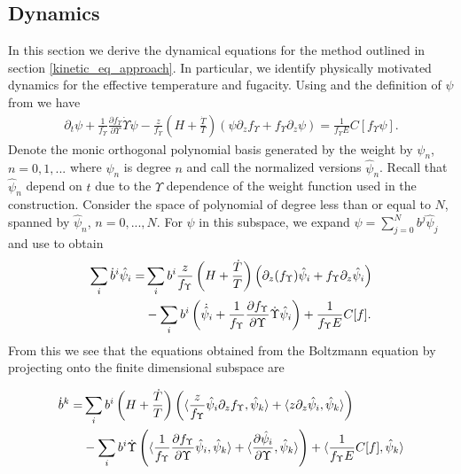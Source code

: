 \subsection{Dynamics}\label{dynamics_sec}
In this section we derive the dynamical equations for the  method outlined in section \ref{kinetic_eq_approach}.  In particular, we identify physically motivated dynamics for the effective temperature and fugacity.  Using  and the definition of $\psi$ from  we have
\begin{align}\label{near_equilib_eq}
\partial_t \psi+\frac{1}{f_\Upsilon }\frac{\partial f_\Upsilon }{\partial\Upsilon}\dot\Upsilon\psi-\frac{z}{f_\Upsilon }\left(H+\frac{\dot{T}}{T}\right)\left(\psi\partial_zf_\Upsilon +f_\Upsilon \partial_z \psi\right)=\frac{1}{f_\Upsilon E}C[f_\Upsilon \psi].
\end{align}
 Denote the monic orthogonal polynomial basis generated by the weight  by $\psi_n$, $n=0,1,...$ where $\psi_n$ is degree $n$ and call the normalized versions  $\hat{\psi}_n$. Recall that $\hat\psi_n$ depend on $t$ due to the $\Upsilon$ dependence of the weight function used in the construction. Consider the space of polynomial of degree less than or equal to $N$, spanned by $\hat\psi_n$, $n=0,...,N$.   For $\psi$ in this subspace, we expand $\psi=\sum_{j=0}^Nb^j\hat\psi_j$ and use   to obtain
\begin{align}\label{T_vars}
\sum_i \dot{b}^i\hat\psi_i=&\sum_ib^i\frac{z}{f_\Upsilon }\left(H+\frac{\dot{T}}{T}\right)\left(\partial_z(f_\Upsilon )\hat\psi_i+f_\Upsilon \partial_z\hat\psi_i\right)\\
&-\sum_ib^i\left(\dot{\hat{\psi}}_i+\frac{1}{f_\Upsilon }\frac{\partial f_\Upsilon }{\partial\Upsilon}\dot\Upsilon\hat\psi_i\right)+\frac{1}{f_\Upsilon E}C[f].
\notag
\end{align}
From this we see  that the equations obtained from the Boltzmann equation by projecting onto the finite dimensional subspace are

\begin{align}
\dot b^k=& \sum_i b^i\left(H+\frac{\dot{T}}{T}\right)\left(\langle\frac{z}{f_\Upsilon }\hat\psi_i\partial_zf_\Upsilon ,\hat\psi_k\rangle+\langle z\partial_z \hat\psi_i,\hat\psi_k\rangle\right) \\
&-\sum_i b^i\dot{\Upsilon}\left(\langle\frac{1}{f_\Upsilon }\frac{\partial f_\Upsilon }{\partial\Upsilon}\hat\psi_i,\hat\psi_k\rangle+\langle\frac{\partial\hat{\psi}_i}{\partial \Upsilon},\hat\psi_k\rangle\right)+\langle\frac{1}{f_\Upsilon E}C[f],\hat\psi_k\rangle\notag
\end{align}

